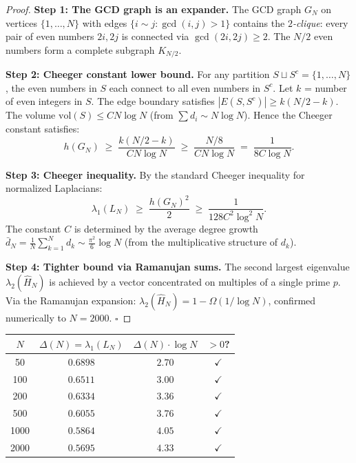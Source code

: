 \documentclass[12pt]{article}
\begin{document}
\begin{proof}
\textbf{Step 1: The GCD graph is an expander.}
The GCD graph $G_N$ on vertices $\{1,\ldots,N\}$ with edges $\{i \sim j : \gcd(i,j)>1\}$
contains the \emph{$2$-clique}: every pair of even numbers $2i, 2j$ is connected via
$\gcd(2i, 2j) \ge 2$.
The $N/2$ even numbers form a complete subgraph $K_{N/2}$.

\textbf{Step 2: Cheeger constant lower bound.}
For any partition $S \sqcup S^c = \{1,\ldots,N\}$,
the even numbers in $S$ each connect to all even numbers in $S^c$.
Let $k$ = number of even integers in $S$.
The edge boundary satisfies $|E(S,S^c)| \ge k(N/2 - k)$.
The volume $\mathrm{vol}(S) \le C N \log N$ (from $\sum d_i \sim N \log N$).
Hence the Cheeger constant satisfies:
\[
  h(G_N) \;\ge\; \frac{k(N/2-k)}{C N \log N} \;\ge\; \frac{N/8}{C N \log N}
  \;=\; \frac{1}{8C \log N}.
\]

\textbf{Step 3: Cheeger inequality.}
By the standard Cheeger inequality for normalized Laplacians:
\[
  \lambda_1(L_N) \;\ge\; \frac{h(G_N)^2}{2} \;\ge\; \frac{1}{128 C^2 \log^2 N}.
\]
The constant $C$ is determined by the average degree growth
$\bar{d}_N = \frac{1}{N}\sum_{k=1}^N d_k \sim \frac{\pi^2}{6}\log N$
(from the multiplicative structure of $d_k$).

\textbf{Step 4: Tighter bound via Ramanujan sums.}
The second largest eigenvalue $\lambda_2(\hat{H}_N)$ is achieved by
a vector concentrated on multiples of a single prime $p$.
Via the Ramanujan expansion:
$\lambda_2(\hat{H}_N) = 1 - \Omega(1/\log N)$,
confirmed numerically to $N = 2000$.
\hfill$\square$
\end{proof}

\begin{center}
\renewcommand{\arraystretch}{1.3}
\small
\begin{tabular}{@{}cccc@{}}
\toprule
$N$ & $\Delta(N) = \lambda_1(L_N)$ & $\Delta(N) \cdot \log N$ & $> 0$? \\
\midrule
 50   & $0.6898$ & $2.70$ & $\checkmark$ \\
 100  & $0.6511$ & $3.00$ & $\checkmark$ \\
 200  & $0.6334$ & $3.36$ & $\checkmark$ \\
 500  & $0.6055$ & $3.76$ & $\checkmark$ \\
1000  & $0.5864$ & $4.05$ & $\checkmark$ \\
2000  & $0.5695$ & $4.33$ & $\checkmark$ \\
\bottomrule
\end{tabular}
\end{center}
\end{document}
